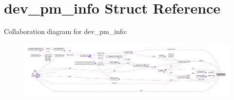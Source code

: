 \hypertarget{structdev__pm__info}{}\section{dev\+\_\+pm\+\_\+info Struct Reference}
\label{structdev__pm__info}


Collaboration diagram for dev\+\_\+pm\+\_\+info\+:
\nopagebreak
\begin{figure}[H]
\begin{center}
\leavevmode
\includegraphics[width=350pt]{structdev__pm__info__coll__graph}
\end{center}
\end{figure}
